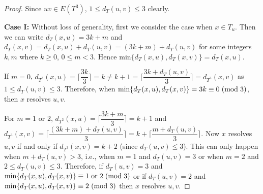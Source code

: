 \documentclass{article}
\theoremstyle{definition}
\numberwithin{equation}{section}
\begin{document}
\begin{proof} 
Since $uv\in E(T^{3})$, $1\leq d_{T}(u,v)\leq 3$ clearly.

\vspace{0.2em}
\noindent \textbf{Case I:} Without loss of generality, first we consider the case when $x\in T_{u}$. Then we can write $d_{T}(x,u)=3k+m$ and $d_{T}(x,v)=d_{T}(x,u)+d_{T}(u,v)=(3k+m)+d_{T}(u,v)$ for some integers $k,m$ where $k\geq0$, $0\leq m<3$. Hence $\text{min}\{d_{T}(x,u),d_{T}(x,v)\}=d_{T}(x,u)$.  
\vspace{0.2em}

 If $m=0$, $d_{T^{3}}(x,u)=\lceil{\dfrac{3k}{3}}\rceil=k\neq k+1=\lceil{\dfrac{3k+d_{T}(u,v)}{3}}\rceil= d_{T^{3}}(x,v)$ as $1\leq d_{T}(u,v)\leq 3$. Therefore, when $\text{min}\{d_{T}(x,u),d_{T}(x,v)\}=3k\equiv 0\hspace{0.3 em} (\text{mod} \hspace{0.3 em} 3)$, then $x$ resolves $u,v$.


\vspace{0.3em}
For $m=1$ or $2$,  $d_{T^{3}}(x,u)=\lceil{\dfrac{3k+m}{3}}\rceil=k+1$ and $d_{T^{3}}(x,v)=\lceil \dfrac{(3k+m)+d_{T}(u,v)}{3} \rceil=k+\lceil \dfrac{m+d_{T}(u,v)}{3}\rceil$. Now $x$ resolves $u,v$ if and only if $d_{T^{3}}(x,v)=k+2$ (since $d_{T}(u,v)\leq 3$). This can only happen when $m+d_{T}(u,v)>3$, i.e., when $m=1$ and $d_{T}(u,v)=3$ or when $m=2$ and $2\leq d_{T}(u,v)\leq 3$. Therefore, if $d_{T}(u,v)=3$ and $\text{min}\{d_{T}(x,u),d_{T}(x,v)\}\equiv 1 \hspace{0.3 em} \text{or} \hspace{0.3 em} 2\hspace{0.3 em} (\text{mod} \hspace{0.3 em} 3)$ or if  $d_{T}(u,v)=2$ and $\text{min}\{d_{T}(x,u),d_{T}(x,v)\}\equiv 2 \hspace{0.3 em} (\text{mod} \hspace{0.3 em} 3)$ then $x$ resolves $u,v$.

 


\end{proof}
\end{document}
